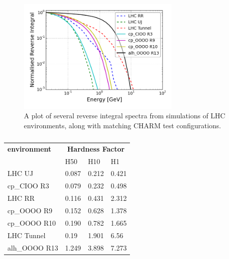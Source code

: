 \newpage

\begin{figure}[ht!]
	\centering
	\includegraphics[width=0.7\textwidth]{./images/hardness/lhc_charm_comparison}
	\caption{A plot of several reverse integral spectra from simulations of LHC environments, along with matching CHARM test configurations.}
	\label{fig:lhc_charm_comparison}
\end{figure}

\begin{table}[htbp]
\centering
\begin{tabular}{l|l|l|l}
\textbf{environment} & \multicolumn{3}{c}{\textbf{Hardness Factor}} \\ \cline{2-4}
				& H50   & H10   & H1 \\
\hline
\hline
\rowcolor{gray!30} LHC UJ & 0.087 & 0.212 & 0.421 \\
cp\_CIOO R3	& 0.079 & 0.232 & 0.498 \\

\hline
\rowcolor{gray!30} LHC RR & 0.116 & 0.431 & 2.312 \\
cp\_OOOO R9  & 0.152 & 0.628 & 1.378 \\
cp\_OOOO R10 & 0.190 & 0.782 & 1.665 \\

\hline
\rowcolor{gray!30} LHC Tunnel & 0.19  & 1.901 & 6.56 \\
alh\_OOOO R13 & 1.249 & 3.898 & 7.273 \\
\end{tabular}%
\caption{}
\label{tab:hardness_factor_lhc}%
\end{table}%

\clearpage

